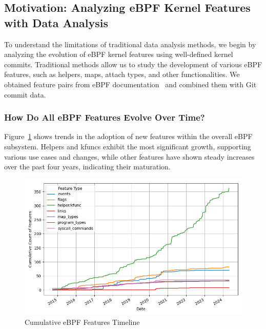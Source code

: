 
\subsection{Motivation: Analyzing eBPF Kernel Features with Data Analysis}

To understand the limitations of traditional data analysis methods, we begin by analyzing the evolution of eBPF kernel features using well-defined kernel commits. Traditional methods allow us to study the development of various eBPF features, such as helpers, maps, attach types, and other functionalities. We obtained feature pairs from eBPF documentation~\cite{ebpfdocs} and combined them with Git commit data.

\subsubsection{How Do All eBPF Features Evolve Over Time?}

Figure~\ref{fig:cumulative_feature_timeline} shows trends in the adoption of new features within the overall eBPF subsystem. Helpers and kfuncs exhibit the most significant growth, supporting various use cases and changes, while other features have shown steady increases over the past four years, indicating their maturation.

\begin{figure}[ht]
    \centering
    \includegraphics[width=\linewidth]{feature-analysis/cumulative_bpf_features_timeline.png}
    \caption{Cumulative eBPF Features Timeline}
    \label{fig:cumulative_feature_timeline}
\end{figure}

